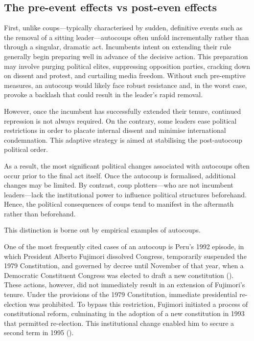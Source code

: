 \documentclass[
  12pt,
]{report}
\begin{document}
\subsection{\texorpdfstring{\textbf{The pre-event effects vs post-even
effects}}{The pre-event effects vs post-even effects}}\label{the-pre-event-effects-vs-post-even-effects}

First, unlike coups---typically characterised by sudden, definitive
events such as the removal of a sitting leader---autocoups often unfold
incrementally rather than through a singular, dramatic act. Incumbents
intent on extending their rule generally begin preparing well in advance
of the decisive action. This preparation may involve purging political
elites, suppressing opposition parties, cracking down on dissent and
protest, and curtailing media freedom. Without such pre-emptive
measures, an autocoup would likely face robust resistance and, in the
worst case, provoke a backlash that could result in the leader's rapid
removal.

However, once the incumbent has successfully extended their tenure,
continued repression is not always required. On the contrary, some
leaders ease political restrictions in order to placate internal dissent
and minimise international condemnation. This adaptive strategy is aimed
at stabilising the post-autocoup political order.

As a result, the most significant political changes associated with
autocoups often occur prior to the final act itself. Once the autocoup
is formalised, additional changes may be limited. By contrast, coup
plotters---who are not incumbent leaders---lack the institutional power
to influence political structures beforehand. Hence, the political
consequences of coups tend to manifest in the aftermath rather than
beforehand.

This distinction is borne out by empirical examples of autocoups.

One of the most frequently cited cases of an autocoup is Peru's 1992
episode, in which President Alberto Fujimori dissolved Congress,
temporarily suspended the 1979 Constitution, and governed by decree
until November of that year, when a Democratic Constituent Congress was
elected to draft a new constitution (). These actions, however, did not immediately result
in an extension of Fujimori's tenure. Under the provisions of the 1979
Constitution, immediate presidential re-election was prohibited. To
bypass this restriction, Fujimori initiated a process of constitutional
reform, culminating in the adoption of a new constitution in 1993 that
permitted re-election. This institutional change enabled him to secure a
second term in 1995 ().
\end{document}
